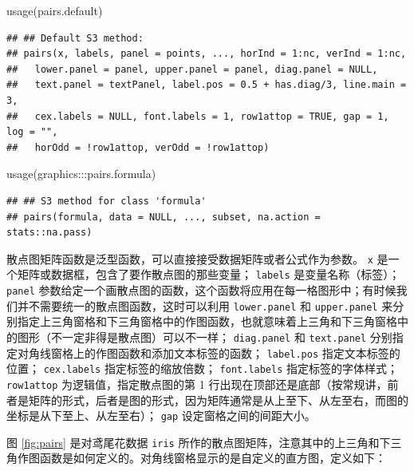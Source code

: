 \documentclass[
  b5paper,
  UTF8,twoside]{book}
\newenvironment{Shaded}{\begin{snugshade}}{\end{snugshade}}
\newcommand{\FunctionTok}[1]{\textcolor[rgb]{0.00,0.00,0.00}{#1}}
\newcommand{\NormalTok}[1]{#1}
\newcommand{\SpecialCharTok}[1]{\textcolor[rgb]{0.00,0.00,0.00}{#1}}
\begin{document}
\begin{Shaded}
\begin{Highlighting}[]
\FunctionTok{usage}\NormalTok{(pairs.default)}
\end{Highlighting}
\end{Shaded}

\begin{verbatim}
## ## Default S3 method:
## pairs(x, labels, panel = points, ..., horInd = 1:nc, verInd = 1:nc,
##   lower.panel = panel, upper.panel = panel, diag.panel = NULL,
##   text.panel = textPanel, label.pos = 0.5 + has.diag/3, line.main = 3,
##   cex.labels = NULL, font.labels = 1, row1attop = TRUE, gap = 1, log = "",
##   horOdd = !row1attop, verOdd = !row1attop)
\end{verbatim}

\begin{Shaded}
\begin{Highlighting}[]
\FunctionTok{usage}\NormalTok{(graphics}\SpecialCharTok{:::}\NormalTok{pairs.formula)}
\end{Highlighting}
\end{Shaded}

\begin{verbatim}
## ## S3 method for class 'formula'
## pairs(formula, data = NULL, ..., subset, na.action = stats::na.pass)
\end{verbatim}

散点图矩阵函数是泛型函数，可以直接接受数据矩阵或者公式作为参数。 \texttt{x} 是一个矩阵或数据框，包含了要作散点图的那些变量； \texttt{labels} 是变量名称（标签）； \texttt{panel} 参数给定一个画散点图的函数，这个函数将应用在每一格图形中；有时候我们并不需要统一的散点图函数，这时可以利用 \texttt{lower.panel} 和 \texttt{upper.panel} 来分别指定上三角窗格和下三角窗格中的作图函数，也就意味着上三角和下三角窗格中的图形（不一定非得是散点图）可以不一样； \texttt{diag.panel} 和 \texttt{text.panel} 分别指定对角线窗格上的作图函数和添加文本标签的函数； \texttt{label.pos} 指定文本标签的位置； \texttt{cex.labels} 指定标签的缩放倍数； \texttt{font.labels} 指定标签的字体样式； \texttt{row1attop} 为逻辑值，指定散点图的第 1 行出现在顶部还是底部（按常规讲，前者是矩阵的形式，后者是图的形式，因为矩阵通常是从上至下、从左至右，而图的坐标是从下至上、从左至右）； \texttt{gap} 设定窗格之间的间距大小。

图 \ref{fig:pairs}
是对鸢尾花数据 \texttt{iris} 所作的散点图矩阵，注意其中的上三角和下三角作图函数是如何定义的。对角线窗格显示的是自定义的直方图，定义如下：
\end{document}
